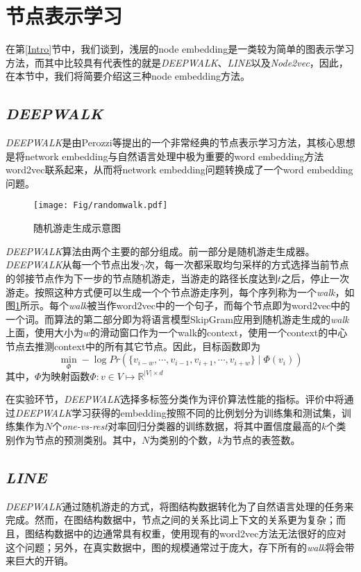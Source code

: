 \section{节点表示学习}\label{sec:nodeem}
在第\ref{Intro}节中，我们谈到，浅层的node embedding是一类较为简单的图表示学习方法，而其中比较具有代表性的就是\emph{DEEPWALK}、\emph{LINE}以及\emph{Node2vec}，因此，在本节中，我们将简要介绍这三种node embedding方法。

\subsection{\emph{DEEPWALK}}
\emph{DEEPWALK}是由Perozzi等\cite{perozzi2014deepwalk}提出的一个非常经典的节点表示学习方法，其核心思想是将network embedding与自然语言处理中极为重要的word embedding方法word2vec联系起来，从而将network embedding问题转换成了一个word embedding问题。

\begin{figure}[!htbp]
  \centering
  \texttt{[image: Fig/randomwalk.pdf]}
  \caption{随机游走生成示意图\cite{perozzi2014deepwalk}}
  \label{fig:randomwalk}
\end{figure}

\emph{DEEPWALK}算法由两个主要的部分组成。前一部分是随机游走生成器。\emph{DEEPWALK}从每一个节点出发$\gamma$次，每一次都采取均匀采样的方式选择当前节点的邻接节点作为下一步的节点随机游走，当游走的路径长度达到$t$之后，停止一次游走。按照这种方式便可以生成一个个节点游走序列，每个序列称为一个\emph{walk}，如图\ref{fig:randomwalk}所示。每个\emph{walk}被当作word2vec中的一个句子，而每个节点即为word2vec中的一个词。而算法的第二部分即为将语言模型SkipGram应用到随机游走生成的\emph{walk}上面，使用大小为$w$的滑动窗口作为一个walk的context，使用一个context的中心节点去推测context中的所有其它节点。因此，目标函数即为
\[\min_{\Phi}-\log{Pr}(\{v_{i-w}, \cdots, v_{i-1}, v_{i+1}, \cdots, v_{i+w}\}\mid \Phi(v_i))\]
其中，$\Phi$为映射函数$\Phi: v\in V\mapsto \mathbb{R}^{|V|\times d}$

在实验环节，\emph{DEEPWALK}选择多标签分类作为评价算法性能的指标。评价中将通过\emph{DEEPWALK}学习获得的embedding按照不同的比例划分为训练集和测试集，训练集作为$N$个\emph{one-vs-rest}对率回归分类器的训练数据，将其中置信度最高的$k$个类别作为节点的预测类别。其中，$N$为类别的个数，$k$为节点的表签数。

\subsection{\emph{LINE}}
\emph{DEEPWALK}通过随机游走的方式，将图结构数据转化为了自然语言处理的任务来完成。然而，在图结构数据中，节点之间的关系比词上下文的关系更为复杂；而且，图结构数据中的边通常具有权重，使用现有的word2vec方法无法很好的应对这个问题；另外，在真实数据中，图的规模通常过于庞大，存下所有的\emph{walk}将会带来巨大的开销。

